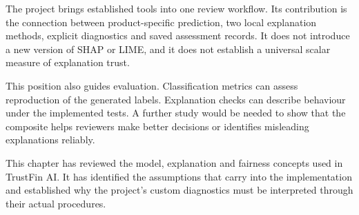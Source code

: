 The project brings established tools into one review workflow. Its contribution is the connection between product-specific prediction, two local explanation methods, explicit diagnostics and saved assessment records. It does not introduce a new version of SHAP or LIME, and it does not establish a universal scalar measure of explanation trust.

This position also guides evaluation. Classification metrics can assess reproduction of the generated labels. Explanation checks can describe behaviour under the implemented tests. A further study would be needed to show that the composite helps reviewers make better decisions or identifies misleading explanations reliably.

\par\medskip\noindent
This chapter has reviewed the model, explanation and fairness concepts used in TrustFin AI. It has identified the assumptions that carry into the implementation and established why the project's custom diagnostics must be interpreted through their actual procedures.
